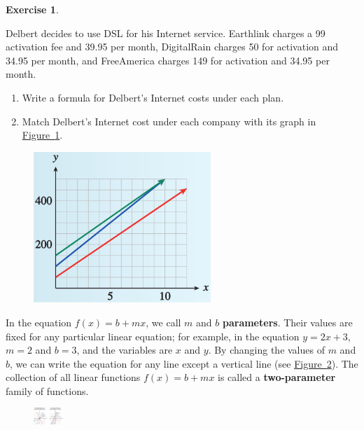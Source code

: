 \documentclass[10pt,]{book}
\newcommand{\terminology}[1]{\textbf{#1}}
\theoremstyle{plain}
\theoremstyle{definition}
\newtheorem{exercise}[theorem]{Exercise}
\theoremstyle{definition}
\numberwithin{equation}{section}
\begin{document}
\begin{exercise}\label{exercise-dsl-price}

Delbert decides to use DSL for his Internet service. Earthlink charges a \textdollar{}99 activation fee and \textdollar{}39.95 per month, DigitalRain charges \textdollar{}50 for activation and \textdollar{}34.95 per month, and FreeAmerica charges \textdollar{}149 for activation and \textdollar{}34.95 per month.
\leavevmode%
\begin{enumerate}[label=*\alph**]
\item\hypertarget{li-160}{}Write a formula for Delbert's Internet costs under each plan.
    \item\hypertarget{li-161}{}Match Delbert's Internet cost under each company with its graph in \hyperref[fig-dsl-price]{Figure~\ref{fig-dsl-price}}.
    \end{enumerate}
\leavevmode%
\begin{figure}
\centering
\includegraphics[width=0.60\textwidth,]{images/fig-dsl-price.svg}\caption{\label{fig-dsl-price}}
\end{figure}
\end{exercise}
\par

    In the equation \(f (x) = b + mx\), we call \(m\) and \(b\) \terminology{parameters}. Their values are fixed for any particular linear equation; for example, in the equation \(y = 2x + 3\), \(m = 2\) and \(b = 3\), and the variables are \(x\) and \(y\). By changing the values of \(m\) and \(b\), we can write the equation for any line except a vertical line (see \hyperref[fig-slope-vs-intercept]{Figure~\ref{fig-slope-vs-intercept}}). The collection of all linear functions \(f (x) = b + mx\) is called a \terminology{two-parameter} family of functions.
%
\leavevmode%
\begin{figure}
\centering
\includegraphics[width=0.100\textwidth,]{images/fig-slope-vs-intercept.svg}\caption{\label{fig-slope-vs-intercept}}
\end{figure}
\typeout{************************************************}
\typeout{************************************************}
\end{document}
